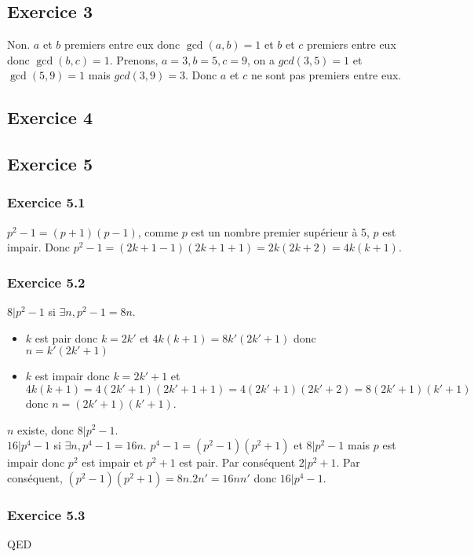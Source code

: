 \documentclass[]{book}
\theoremstyle{definition}
\begin{document}
\subsection*{Exercice 3}
Non. $a$ et $b$ premiers entre eux donc $\gcd(a,b) = 1$ et $b$ et $c$ premiers entre eux donc $\gcd(b,c) = 1$. Prenons, $a=3, b=5, c=9$, on a $gcd(3,5) = 1$ et $\gcd(5,9) = 1$ mais $gcd(3,9) = 3$. Donc $a$ et $c$ ne sont pas premiers entre eux.

\subsection*{Exercice 4}


\subsection*{Exercice 5}
\subsubsection*{Exercice 5.1}
$p^2 -1 = (p+1)(p-1)$, comme $p$ est un nombre premier sup\'erieur \`a 5, $p$ est impair. Donc $p^2 - 1 = (2k+1-1)(2k+1+1) = 2k(2k+2) = 4k(k+1)$.

\subsubsection*{Exercice 5.2}
$8 | p^2-1$ si $\exists n, p^2-1 = 8n$. 
\begin{itemize}
\item $k$ est pair donc $k=2k'$ et $4k(k+1) = 8k'(2k'+1)$ donc $n = k'(2k'+1)$
\item $k$ est impair donc $k=2k'+1$ et $4k(k+1) = 4(2k'+1)(2k'+1+1) = 4(2k'+1)(2k'+2) = 8(2k'+1)(k'+1)$ donc $n=(2k'+1)(k'+1)$.
\end{itemize}
$n$ existe, donc $8 | p^2 - 1$.\\

$16 | p^4-1$ si $\exists n, p^4-1 = 16n$. 
$p^4-1 = (p^2-1)(p^2+1)$ et $8 | p^2 -1$ mais $p$ est impair donc $p^2$ est impair et $p^2+1$ est pair. Par cons\'equent $2 | p^2 + 1$. Par cons\'equent, $(p^2-1)(p^2+1) = 8n.2n' = 16nn'$ donc $16 | p^4-1$.

\subsubsection*{Exercice 5.3}

 




QED
\end{document}
